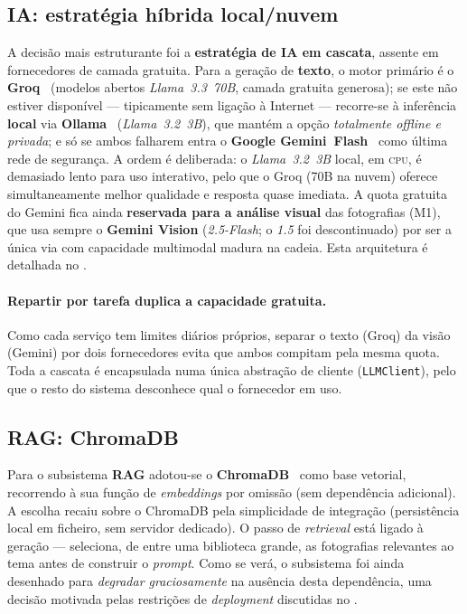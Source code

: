 \subsection{IA: estratégia híbrida local/nuvem}

A decisão mais estruturante foi a \textbf{estratégia de IA em cascata},
assente em fornecedores de camada gratuita. Para a geração de \textbf{texto},
o motor primário é o \textbf{Groq}~\cite{groq} (modelos abertos \emph{Llama~3.3~70B},
camada gratuita generosa); se este não estiver disponível --- tipicamente
sem ligação à Internet --- recorre-se à inferência \textbf{local} via
\textbf{Ollama}~\cite{ollama} (\emph{Llama~3.2~3B}), que mantém a opção \emph{totalmente
offline e privada}; e só se ambos falharem entra o \textbf{Google
Gemini~Flash}~\cite{gemini} como última rede de segurança. A ordem é deliberada: o
\emph{Llama~3.2~3B} local, em \textsc{cpu}, é demasiado lento para uso
interativo, pelo que o Groq (70B na nuvem) oferece simultaneamente melhor
qualidade e resposta quase imediata. A quota gratuita do Gemini fica ainda
\textbf{reservada para a análise visual} das fotografias (M1), que usa
sempre o \textbf{Gemini Vision} (\emph{2.5-Flash}; o \emph{1.5} foi
descontinuado) por ser a única via com capacidade multimodal madura na
cadeia. Esta arquitetura é detalhada no .

\paragraph{Repartir por tarefa duplica a capacidade gratuita.} Como cada
serviço tem limites diários próprios, separar o texto (Groq) da visão
(Gemini) por dois fornecedores evita que ambos compitam pela mesma quota.
Toda a cascata é encapsulada numa única abstração de cliente
(\texttt{LLMClient}), pelo que o resto do sistema desconhece qual o
fornecedor em uso.

\subsection{RAG: ChromaDB}

Para o subsistema \textbf{RAG} adotou-se o \textbf{ChromaDB}~\cite{chromadb} como base
vetorial, recorrendo à sua função de \emph{embeddings} por omissão
(sem dependência adicional). A escolha recaiu sobre o ChromaDB pela
simplicidade de integração (persistência local em ficheiro, sem servidor
dedicado). O passo de
\emph{retrieval} está ligado à geração — seleciona, de entre uma
biblioteca grande, as fotografias relevantes ao tema antes de construir o
\emph{prompt}. Como se verá, o subsistema foi ainda desenhado para
\emph{degradar graciosamente} na ausência desta dependência, uma decisão
motivada pelas restrições de \emph{deployment} discutidas no
.

